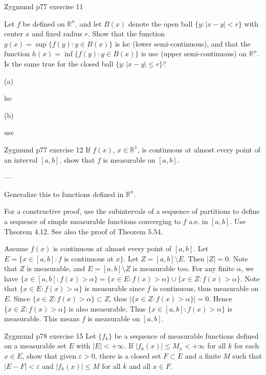 \documentclass[UTF8,a4paper,10pt]{article}
\begin{document}
\begin{Problem}[]{Zygmund p77 exercise 11}

  Let $f$ be defined on $\mathbb{R}^n$, and let $B(x)$ denote the open ball $\{y : |x - y| < r\}$ with center $x$ and fixed radius $r$. Show that the function $g(x) = \sup\{f(y) : y \in B(x)\}$ is lsc (lower semi-continuous), and that the function $h(x) = \inf\{f(y) : y \in B(x)\}$ is usc (upper semi-continuous) on $\mathbb{R}^n$. Is the same true for the closed ball $\{y : |x - y| \leq r\}$?


\end{Problem}


(a)

lsc


(b)

usc



\begin{Problem}[]{Zygmund p77 exercise 12}
  If $f(x)$, $x \in \mathbb{R}^1$, is continuous at almost every point of an interval $[a, b]$, show that $f$ is measurable on $[a, b]$. 
  
  ---

  Generalize this to functions defined in $\mathbb{R}^n$. 
  
  For a constructive proof, use the subintervals of a sequence of partitions to define a sequence of simple measurable functions converging to $f$ a.e. in $[a, b]$. Use Theorem 4.12. See also the proof of Theorem 5.54.

    \end{Problem}

    Assume $f(x)$ is continuous at almost every point of $[a, b]$. Let
$E = \{x \in [a, b] : f$ is continuous at $x\}$.
Let $Z = [a, b] \setminus E$. Then $|Z| = 0$. Note that $Z$ is measurable, and
$E = [a, b] \setminus Z$ is measurable too.
For any finite $\alpha$, we have
$\{x \in [a, b] : f(x) > \alpha\} = \{x \in E : f(x) > \alpha\} \cup \{x \in Z : f(x) > \alpha\}$.
Note that $\{x \in E : f(x) > \alpha\}$ is measurable since $f$ is continuous, thus
measurable on $E$.
Since $\{x \in Z : f(x) > \alpha\} \subset Z$, thus $|\{x \in Z : f(x) > \alpha\}| = 0$. Hence
$\{x \in Z : f(x) > \alpha\}$ is also measurable.
Thus $\{x \in [a, b] : f(x) > \alpha\}$ is measurable. This means $f$ is measurable
on $[a, b]$.

  
\pagebreak

  \begin{Problem}[]{Zygmund p78 exercise 15}
Let $\{f_k\}$ be a sequence of measurable functions defined on a measurable set $E$ with $|E| < +\infty$. If $|f_k(x)| \leq M_x < +\infty$ for all $k$ for each $x \in E$, show that given $\varepsilon > 0$, there is a closed set $F \subset E$ and a finite $M$ such that $|E - F| < \varepsilon$ and $|f_k(x)| \leq M$ for all $k$ and all $x \in F$.

  \end{Problem}
\end{document}

